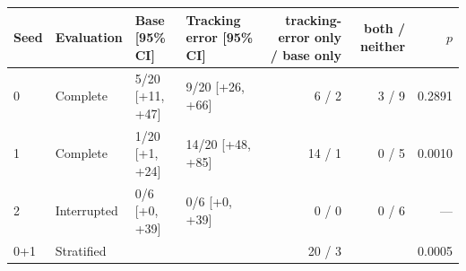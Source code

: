 \begin{tabular}{llllrrr}
\toprule
Seed & Evaluation & Base [95\% CI] & Tracking error [95\% CI] & tracking-error only / base only & both / neither & $p$ \\
\midrule
0 & Complete & 5/20 [+11, +47] & 9/20 [+26, +66] & 6 / 2 & 3 / 9 & 0.2891 \\
1 & Complete & 1/20 [+1, +24] & 14/20 [+48, +85] & 14 / 1 & 0 / 5 & 0.0010 \\
2 & Interrupted & 0/6 [+0, +39] & 0/6 [+0, +39] & 0 / 0 & 0 / 6 & --- \\
\midrule
0+1 & Stratified & & & 20 / 3 & & 0.0005 \\
\bottomrule
\end{tabular}
